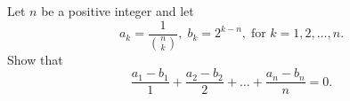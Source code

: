 \documentclass{article}
\begin{document}
\setlength{\parindent}{0pt}
Let $n$ be a positive integer and let$$a_{k}=\frac{1}{\binom{n}{k}},\;b_{k}=2^{k-n},\;\text{for }k=1,2,\dots,n.$$Show that$$\frac{a_{1}-b_{1}}{1}+\frac{a_{2}-b_{2}}{2}+\dots+\frac{a_{n}-b_{n}}{n}=0.$$
\end{document}
